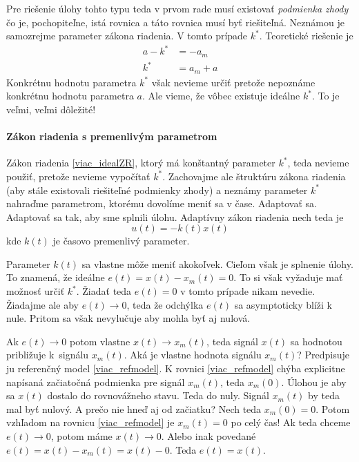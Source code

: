 \documentclass[a4paper, 10pt, ]{article}
\begin{document}
Pre riešenie úlohy tohto typu teda v prvom rade musí existovať \emph{podmienka zhody} čo je, pochopiteľne, istá rovnica a táto rovnica musí byť riešiteľná. Neznámou je samozrejme parameter zákona riadenia. V tomto prípade $k^*$. Teoretické riešenie je
\begin{subequations}
	\begin{align}
		 a - k^* &= -a_m \\
		 k^* &= a_m + a
	\end{align}
\end{subequations}
Konkrétnu hodnotu parametra $k^*$ však nevieme určiť pretože nepoznáme konkrétnu hodnotu parametra $a$. Ale vieme, že vôbec existuje ideálne $k^*$. To je veľmi, veľmi dôležité!













\paragraph{Zákon riadenia s premenlivým parametrom}

Zákon riadenia \eqref{viac_idealZR}, ktorý má konštantný parameter $k^*$, teda nevieme použiť, pretože nevieme vypočítať $k^*$. Zachovajme ale štruktúru zákona riadenia (aby stále existovali riešiteľné podmienky zhody) a neznámy parameter $k^*$ nahraďme parametrom, ktorému dovolíme meniť sa v čase. Adaptovať sa. Adaptovať sa tak, aby sme splnili úlohu. Adaptívny zákon riadenia nech teda je
\begin{equation} \label{adapt_idealZR}
	u(t) = -k(t) x(t)
\end{equation}
kde $k(t)$ je časovo premenlivý parameter.

Parameter $k(t)$ sa vlastne môže meniť akokoľvek. Cieľom však je splnenie úlohy. To znamená, že ideálne $e(t) = x(t) - x_m(t) = 0$. To si však vyžaduje mať možnosť určiť $k^*$. Žiadať teda $e(t) = 0$ v tomto prípade nikam nevedie. Žiadajme ale aby $e(t) \to 0$, teda že odchýlka $e(t)$ sa asymptoticky blíži k nule. Pritom sa však nevylučuje aby mohla byť aj nulová.

Ak $e(t) \to 0$ potom vlastne $x(t) \to x_m(t)$, teda signál $x(t)$ sa hodnotou približuje k~signálu $x_m(t)$. Aká je vlastne hodnota signálu $x_m(t)$? Predpisuje ju referenčný model \eqref{viac_refmodel}. K rovnici \eqref{viac_refmodel} chýba explicitne napísaná začiatočná podmienka pre signál $x_m(t)$, teda $x_m(0)$. Úlohou je aby sa $x(t)$ dostalo do rovnovážneho stavu. Teda do nuly. Signál $x_m(t)$ by teda mal byť nulový. A prečo nie hneď aj od začiatku? Nech teda $x_m(0) = 0$. Potom vzhľadom na rovnicu \eqref{viac_refmodel} je $x_m(t) = 0$ po celý čas! Ak teda chceme $e(t) \to 0$, potom máme $x(t) \to 0$. Alebo inak povedané  $e(t) = x(t) - x_m(t) = x(t) - 0$. Teda $e(t) = x(t)$.
\end{document}

